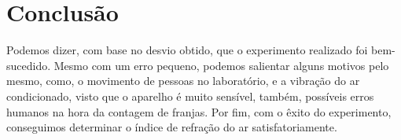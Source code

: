 \section{Conclusão}
Podemos dizer, com base no desvio obtido, que o experimento realizado foi bem-sucedido. Mesmo com um erro pequeno, podemos salientar alguns motivos pelo mesmo, como, o movimento de pessoas no laboratório, e a vibração do ar condicionado, visto que o aparelho é muito sensível, também, possíveis erros humanos na hora da contagem de franjas. Por fim, com o êxito do experimento, conseguimos determinar o índice de refração do ar satisfatoriamente. 
